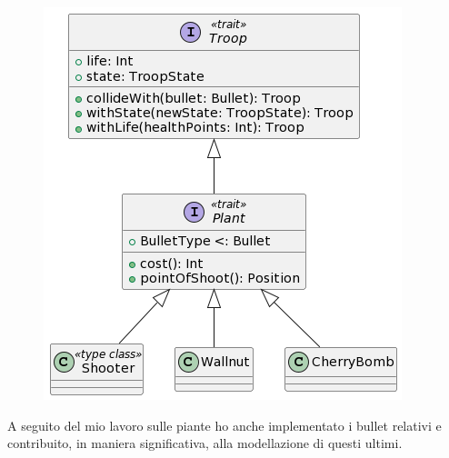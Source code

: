 \begin{figure}[H]
    \centering
    \includegraphics[width=0.8\linewidth]{images/plants.png}
    \label{Diagramma delle classi delle piante.}
\end{figure}

A seguito del mio lavoro sulle piante ho anche implementato i bullet relativi e contribuito, in maniera significativa, alla modellazione di questi ultimi.
